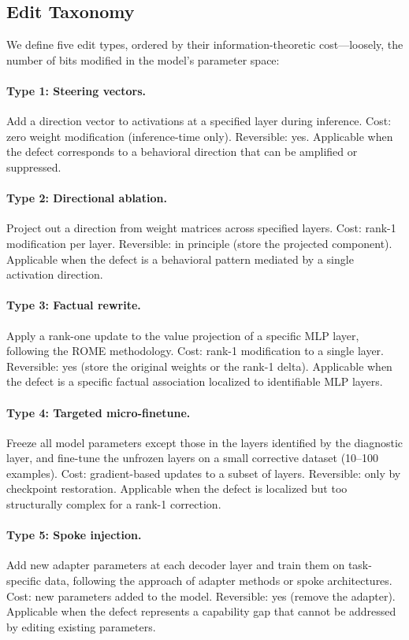 \documentclass[11pt]{article}
\begin{document}
\subsection{Edit Taxonomy}

We define five edit types, ordered by their information-theoretic cost---loosely, the number of bits modified in the model's parameter space:

\paragraph{Type 1: Steering vectors.} Add a direction vector to activations at a specified layer during inference. Cost: zero weight modification (inference-time only). Reversible: yes. Applicable when the defect corresponds to a behavioral direction that can be amplified or suppressed.

\paragraph{Type 2: Directional ablation.} Project out a direction from weight matrices across specified layers. Cost: rank-1 modification per layer. Reversible: in principle (store the projected component). Applicable when the defect is a behavioral pattern mediated by a single activation direction.

\paragraph{Type 3: Factual rewrite.} Apply a rank-one update to the value projection of a specific MLP layer, following the ROME methodology. Cost: rank-1 modification to a single layer. Reversible: yes (store the original weights or the rank-1 delta). Applicable when the defect is a specific factual association localized to identifiable MLP layers.

\paragraph{Type 4: Targeted micro-finetune.} Freeze all model parameters except those in the layers identified by the diagnostic layer, and fine-tune the unfrozen layers on a small corrective dataset (10--100 examples). Cost: gradient-based updates to a subset of layers. Reversible: only by checkpoint restoration. Applicable when the defect is localized but too structurally complex for a rank-1 correction.

\paragraph{Type 5: Spoke injection.} Add new adapter parameters at each decoder layer and train them on task-specific data, following the approach of adapter methods \citep{houlsby2019parameter} or spoke architectures. Cost: new parameters added to the model. Reversible: yes (remove the adapter). Applicable when the defect represents a capability gap that cannot be addressed by editing existing parameters.
\end{document}
